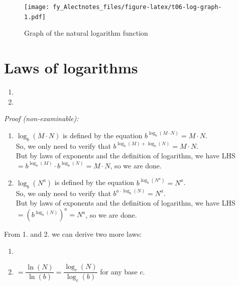 \documentclass[
  12pt,
  oneside]{book}
\theoremstyle{definition}
\theoremstyle{definition}
\theoremstyle{definition}
\theoremstyle{definition}
\theoremstyle{remark}
\begin{document}
\begin{figure}
\centering
\texttt{[image: fy\_Alectnotes\_files/figure-latex/t06-log-graph-1.pdf]}
\caption{\label{fig:t06-log-graph}Graph of the natural logarithm function}
\end{figure}

\section{Laws of logarithms}\label{laws-of-logarithms}

\begin{enumerate}
\def\labelenumi{\arabic{enumi}.}
\item
\item
\end{enumerate}

\emph{Proof (non-examinable):}

\begin{enumerate}
\def\labelenumi{\arabic{enumi}.}
\item
  \(\log_b(M\cdot N)\) is defined by the equation \(b^{\log_b(M\cdot N)}=M\cdot N\).\\
  So, we only need to verify that \(b^{\log_b(M)+\log_b(N)}=M\cdot N\).\\
  But by laws of exponents and the definition of logarithm, we have LHS \(= b^{\log_b(M)}\cdot b^{\log_b(N)}=M\cdot N\), so we are done.
\item
  \(\log_b(N^a)\) is defined by the equation \(b^{\log_b(N^a)}=N^a\).\\
  So, we only need to verify that \(b^{a\cdot \log_b(N)}=N^a\).\\
  But by laws of exponents and the definition of logarithm, we have LHS \(= \left(b^{\log_b(N)}\right)^a= N^a\), so we are done.
\end{enumerate}

From 1. and 2. we can derive two more laws:

\begin{enumerate}
\def\labelenumi{\arabic{enumi}.}
\setcounter{enumi}{2}
\item
\item
   \(=\dfrac{\ln(N)}{\ln(b)} = \dfrac{\log_c(N)}{\log_c(b)}\) for any base \(c\).
\end{enumerate}
\end{document}
